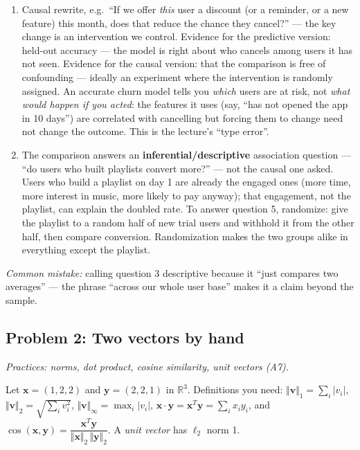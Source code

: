 \documentclass[
  11pt,
]{article}
\newcommand{\answerpage}{\clearpage}
\begin{document}
\begin{solutionbox}
\begin{enumerate}
\def\labelenumi{(\alph{enumi})}
\setcounter{enumi}{1}
\item
  Causal rewrite, e.g.~``If we offer \emph{this} user a discount (or a
  reminder, or a new feature) this month, does that reduce the chance
  they cancel?'' --- the key change is an intervention we control.
  Evidence for the predictive version: held-out accuracy --- the model
  is right about who cancels among users it has not seen. Evidence for
  the causal version: that the comparison is free of confounding ---
  ideally an experiment where the intervention is randomly assigned. An
  accurate churn model tells you \emph{which} users are at risk, not
  \emph{what would happen if you acted}: the features it uses (say,
  ``has not opened the app in 10 days'') are correlated with cancelling
  but forcing them to change need not change the outcome. This is the
  lecture's ``type error''.
\item
  The comparison answers an \textbf{inferential/descriptive} association
  question --- ``do users who built playlists convert more?'' --- not
  the causal one asked. Users who build a playlist on day 1 are already
  the engaged ones (more time, more interest in music, more likely to
  pay anyway); that engagement, not the playlist, can explain the
  doubled rate. To answer question 5, randomize: give the playlist to a
  random half of new trial users and withhold it from the other half,
  then compare conversion. Randomization makes the two groups alike in
  everything except the playlist.
\end{enumerate}

\emph{Common mistake:} calling question 3 descriptive because it ``just
compares two averages'' --- the phrase ``across our whole user base''
makes it a claim beyond the sample.

\end{solutionbox}

\answerpage

\subsection{Problem 2: Two vectors by
hand}\label{problem-2-two-vectors-by-hand}

\emph{Practices: norms, dot product, cosine similarity, unit vectors
(A7).}

Let \(\mathbf{x} = (1, 2, 2)\) and \(\mathbf{y} = (2, 2, 1)\) in
\(\mathbb{R}^3\). Definitions you need:
\(\Vert\mathbf{v}\Vert_1 = \sum_i |v_i|\),
\(\Vert\mathbf{v}\Vert_2 = \sqrt{\sum_i v_i^2}\),
\(\Vert\mathbf{v}\Vert_\infty = \max_i |v_i|\),
\(\mathbf{x}\cdot\mathbf{y} = \mathbf{x}^T\mathbf{y} = \sum_i x_i y_i\),
and
\(\cos(\mathbf{x},\mathbf{y}) = \dfrac{\mathbf{x}^T\mathbf{y}}{\Vert\mathbf{x}\Vert_2\,\Vert\mathbf{y}\Vert_2}\).
A \emph{unit vector} has \(\ell_2\) norm 1.
\end{document}
